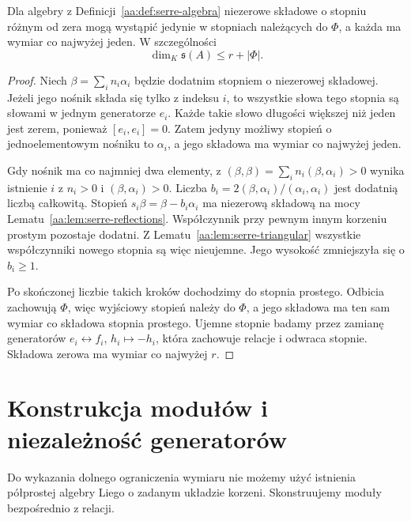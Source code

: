 \begin{twierdzenie}
\label{aa:tw:serre-upper-dimension}
Dla algebry z Definicji~\ref{aa:def:serre-algebra} niezerowe składowe o stopniu różnym od zera mogą wystąpić jedynie w stopniach należących do $\Phi$, a każda ma wymiar co najwyżej jeden. W szczególności
\[
 \dim_K\mathfrak s(A)\le r+|\Phi|.
\]
\end{twierdzenie}
\begin{proof}
Niech $\beta=\sum_i n_i\alpha_i$ będzie dodatnim stopniem o niezerowej składowej. Jeżeli jego nośnik składa się tylko z indeksu $i$, to wszystkie słowa tego stopnia są słowami w jednym generatorze $e_i$. Każde takie słowo długości większej niż jeden jest zerem, ponieważ $[e_i,e_i]=0$. Zatem jedyny możliwy stopień o jednoelementowym nośniku to $\alpha_i$, a jego składowa ma wymiar co najwyżej jeden.

Gdy nośnik ma co najmniej dwa elementy, z
$(\beta,\beta)=\sum_i n_i(\beta,\alpha_i)>0$
wynika istnienie $i$ z $n_i>0$ i $(\beta,\alpha_i)>0$. Liczba
$b_i=2(\beta,\alpha_i)/(\alpha_i,\alpha_i)$ jest dodatnią liczbą całkowitą. Stopień $s_i\beta=\beta-b_i\alpha_i$ ma niezerową składową na mocy Lematu~\ref{aa:lem:serre-reflections}. Współczynnik przy pewnym innym korzeniu prostym pozostaje dodatni. Z Lematu~\ref{aa:lem:serre-triangular} wszystkie współczynniki nowego stopnia są więc nieujemne. Jego wysokość zmniejszyła się o $b_i\ge1$.

Po skończonej liczbie takich kroków dochodzimy do stopnia prostego. Odbicia zachowują $\Phi$, więc wyjściowy stopień należy do $\Phi$, a jego składowa ma ten sam wymiar co składowa stopnia prostego. Ujemne stopnie badamy przez zamianę generatorów $e_i\leftrightarrow f_i$, $h_i\mapsto-h_i$, która zachowuje relacje i odwraca stopnie. Składowa zerowa ma wymiar co najwyżej $r$.
\end{proof}

\section{Konstrukcja modułów i niezależność generatorów}

Do wykazania dolnego ograniczenia wymiaru nie możemy użyć istnienia półprostej algebry Liego o zadanym układzie korzeni. Skonstruujemy moduły bezpośrednio z relacji.

